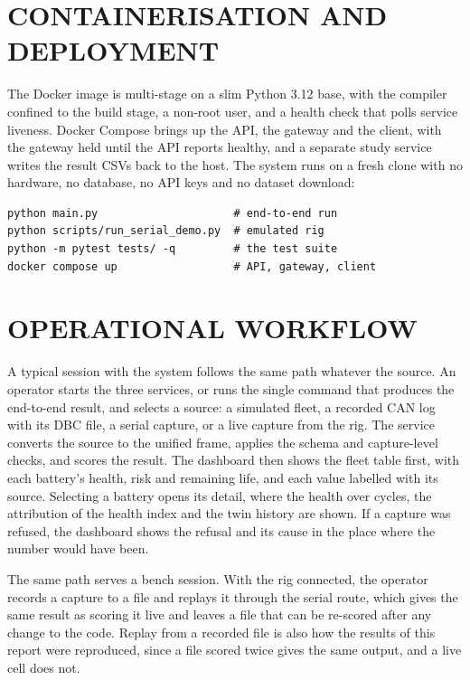 \documentclass[12pt,a4paper]{amritareport}
\begin{document}
\section{CONTAINERISATION AND DEPLOYMENT}
\label{sec:impl-deploy}

The Docker image is multi-stage on a slim Python 3.12 base, with the compiler confined to the build stage, a non-root user, and a health check that polls service liveness. Docker Compose brings up the API, the gateway and the client, with the gateway held until the API reports healthy, and a separate study service writes the result CSVs back to the host. The system runs on a fresh clone with no hardware, no database, no API keys and no dataset download:

\begin{verbatim}
python main.py                     # end-to-end run
python scripts/run_serial_demo.py  # emulated rig
python -m pytest tests/ -q         # the test suite
docker compose up                  # API, gateway, client
\end{verbatim}

\section{OPERATIONAL WORKFLOW}

A typical session with the system follows the same path whatever the source. An operator starts the three services, or runs the single command that produces the end-to-end result, and selects a source: a simulated fleet, a recorded CAN log with its DBC file, a serial capture, or a live capture from the rig. The service converts the source to the unified frame, applies the schema and capture-level checks, and scores the result. The dashboard then shows the fleet table first, with each battery's health, risk and remaining life, and each value labelled with its source. Selecting a battery opens its detail, where the health over cycles, the attribution of the health index and the twin history are shown. If a capture was refused, the dashboard shows the refusal and its cause in the place where the number would have been.

The same path serves a bench session. With the rig connected, the operator records a capture to a file and replays it through the serial route, which gives the same result as scoring it live and leaves a file that can be re-scored after any change to the code. Replay from a recorded file is also how the results of this report were reproduced, since a file scored twice gives the same output, and a live cell does not.
\end{document}
